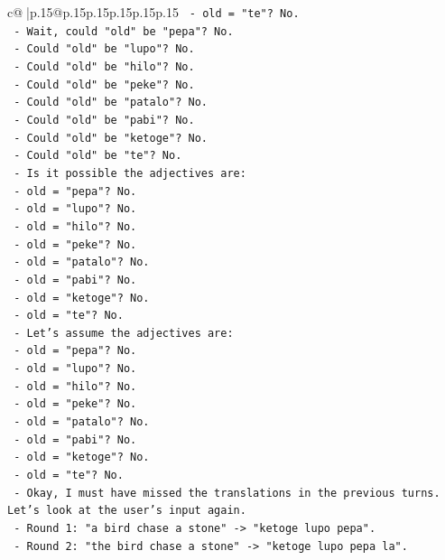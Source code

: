 \documentclass{article}
\begin{document}
{\begin{supertabular}{c@{$\;$}|p{.15\linewidth}@{}p{.15\linewidth}p{.15\linewidth}p{.15\linewidth}p{.15\linewidth}p{.15\linewidth}}
{{{\texttt{        {-} old = "te"? No.} \\
\texttt{      {-} Wait, could "old" be "pepa"? No.} \\
\texttt{      {-} Could "old" be "lupo"? No.} \\
\texttt{      {-} Could "old" be "hilo"? No.} \\
\texttt{      {-} Could "old" be "peke"? No.} \\
\texttt{      {-} Could "old" be "patalo"? No.} \\
\texttt{      {-} Could "old" be "pabi"? No.} \\
\texttt{      {-} Could "old" be "ketoge"? No.} \\
\texttt{      {-} Could "old" be "te"? No.} \\
\texttt{      {-} Is it possible the adjectives are:} \\
\texttt{        {-} old = "pepa"? No.} \\
\texttt{        {-} old = "lupo"? No.} \\
\texttt{        {-} old = "hilo"? No.} \\
\texttt{        {-} old = "peke"? No.} \\
\texttt{        {-} old = "patalo"? No.} \\
\texttt{        {-} old = "pabi"? No.} \\
\texttt{        {-} old = "ketoge"? No.} \\
\texttt{        {-} old = "te"? No.} \\
\texttt{      {-} Let's assume the adjectives are:} \\
\texttt{        {-} old = "pepa"? No.} \\
\texttt{        {-} old = "lupo"? No.} \\
\texttt{        {-} old = "hilo"? No.} \\
\texttt{        {-} old = "peke"? No.} \\
\texttt{        {-} old = "patalo"? No.} \\
\texttt{        {-} old = "pabi"? No.} \\
\texttt{        {-} old = "ketoge"? No.} \\
\texttt{        {-} old = "te"? No.} \\
\texttt{      {-} Okay, I must have missed the translations in the previous turns. Let's look at the user's input again.} \\
\texttt{      {-} Round 1: "a bird chase a stone" {-}> "ketoge lupo pepa".} \\
\texttt{      {-} Round 2: "the bird chase a stone" {-}> "ketoge lupo pepa la".} \\
}}}
\end{supertabular}}
\end{document}
